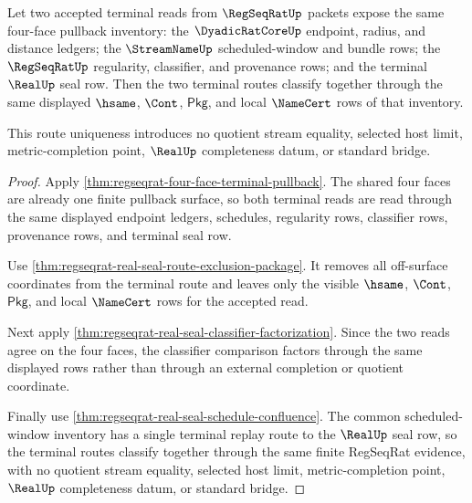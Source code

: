 \begin{theorem}
\label{thm:regseqrat-four-face-terminal-route-uniqueness}
Let two accepted terminal reads from $\RegSeqRatUp$ packets expose the same
four-face pullback inventory: the $\DyadicRatCoreUp$ endpoint, radius, and
distance ledgers; the $\StreamNameUp$ scheduled-window and bundle rows; the
$\RegSeqRatUp$ regularity, classifier, and provenance rows; and the terminal
$\RealUp$ seal row. Then the two terminal routes classify together through the
same displayed $\hsame$, $\Cont$, $\mathsf{Pkg}$, and local $\NameCert$ rows of
that inventory.

This route uniqueness introduces no quotient stream equality, selected host
limit, metric-completion point, $\RealUp$ completeness datum, or standard
bridge.
\end{theorem}
\begin{proof}
Apply \autoref{thm:regseqrat-four-face-terminal-pullback}. The shared four
faces are already one finite pullback surface, so both terminal reads are read
through the same displayed endpoint ledgers, schedules, regularity rows,
classifier rows, provenance rows, and terminal seal row.

Use \autoref{thm:regseqrat-real-seal-route-exclusion-package}. It removes all
off-surface coordinates from the terminal route and leaves only the visible
$\hsame$, $\Cont$, $\mathsf{Pkg}$, and local $\NameCert$ rows for the accepted
read.

Next apply \autoref{thm:regseqrat-real-seal-classifier-factorization}. Since
the two reads agree on the four faces, the classifier comparison factors
through the same displayed rows rather than through an external completion or
quotient coordinate.

Finally use \autoref{thm:regseqrat-real-seal-schedule-confluence}. The common
scheduled-window inventory has a single terminal replay route to the
$\RealUp$ seal row, so the terminal routes classify together through the same
finite RegSeqRat evidence, with no quotient stream equality, selected host
limit, metric-completion point, $\RealUp$ completeness datum, or standard
bridge.
\end{proof}


